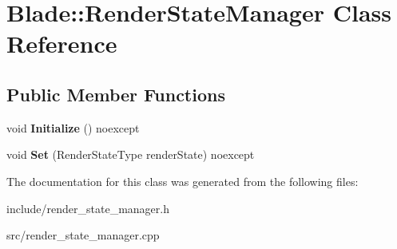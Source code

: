 \hypertarget{class_blade_1_1_render_state_manager}{}\section{Blade\+:\+:Render\+State\+Manager Class Reference}
\label{class_blade_1_1_render_state_manager}
\subsection*{Public Member Functions}
\begin{DoxyCompactItemize}
\item 
\mbox{\label{class_blade_1_1_render_state_manager_a0b26e9c469b8ec7289bb107effc95a8b}} 
void {\bfseries Initialize} () noexcept
\item 
\mbox{\label{class_blade_1_1_render_state_manager_a3d2ef6c7f65efe5dc738db1f66650f0f}} 
void {\bfseries Set} (Render\+State\+Type render\+State) noexcept
\end{DoxyCompactItemize}


The documentation for this class was generated from the following files\+:\begin{DoxyCompactItemize}
\item 
include/render\+\_\+state\+\_\+manager.\+h\item 
src/render\+\_\+state\+\_\+manager.\+cpp\end{DoxyCompactItemize}
